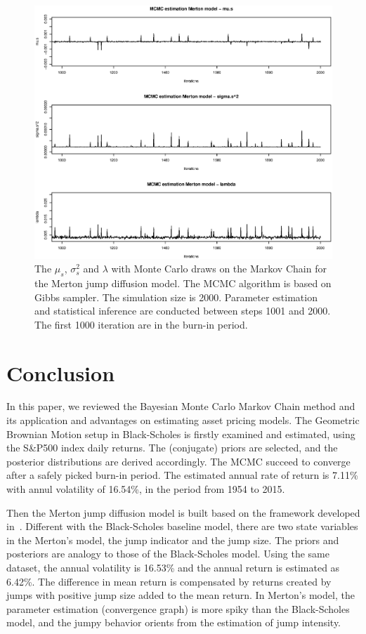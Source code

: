 \documentclass[11pt,reqno,final]{amsart}
\begin{document}
\begin{figure} 
  \centering
  \includegraphics[scale=0.6]{merton_mus_sigmas_lambda.eps}
  \caption{The $\mu_s$, $\sigma_s^2$ and $\lambda$ with Monte Carlo draws on the Markov Chain for the Merton jump diffusion model. The MCMC algorithm is based on Gibbs sampler. The simulation size is 2000. Parameter estimation and statistical inference are conducted between steps 1001 and 2000. The first 1000 iteration are in the burn-in period.}\label{mus_sigmas_lambda_merton}
\end{figure}


\section{Conclusion}
In this paper, we reviewed the Bayesian Monte Carlo Markov Chain method and its application and advantages on estimating asset pricing models. The Geometric Brownian Motion setup in Black-Scholes is firstly examined and estimated, using the S\&P500 index daily returns. The (conjugate) priors are selected, and the posterior distributions are derived accordingly. The MCMC succeed to converge after a safely picked burn-in period. The estimated annual rate of return is 7.11\% with annul volatility of 16.54\%, in the period from 1954 to 2015.

Then the Merton jump diffusion model is built based on the framework developed in~\cite{M76}. Different with the Black-Scholes baseline model, there are two state variables in the Merton's model, the jump indicator and the jump size. The priors and posteriors are analogy to those of the Black-Scholes model. Using the same dataset, the annual volatility is 16.53\% and the annual return is estimated as 6.42\%. The difference in mean return is compensated by returns created by jumps with positive jump size added to the mean return. In Merton's model, the parameter estimation (convergence graph) is more spiky than the Black-Scholes model, and the jumpy behavior orients from the estimation of jump intensity. 
\end{document}
